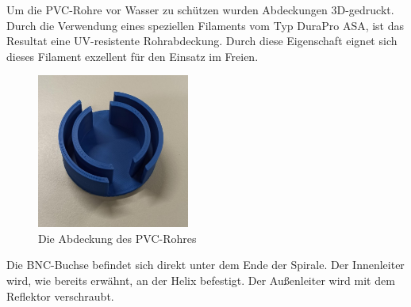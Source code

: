 Um die PVC-Rohre vor Wasser zu schützen wurden Abdeckungen 3D-gedruckt. Durch die Verwendung eines speziellen Filaments vom Typ DuraPro ASA, ist das Resultat eine UV-resistente Rohrabdeckung. Durch diese Eigenschaft eignet sich dieses Filament exzellent für den Einsatz im Freien.

\begin{figure}[h!]
	\centering
	\includegraphics[width=5cm]{../ref/Abdeckung-PVC-Rohr.jpg}
	\caption{Die Abdeckung des PVC-Rohres}
	\label{fig:PVC-Rohr-Abdeckung}
\end{figure}

Die BNC-Buchse befindet sich direkt unter dem Ende der Spirale. Der Innenleiter wird, wie bereits erwähnt, an der Helix befestigt. Der Außenleiter wird mit dem Reflektor verschraubt.

